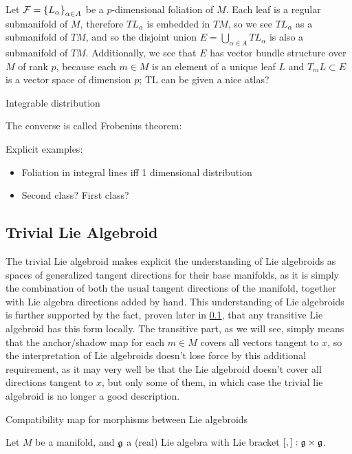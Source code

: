 Let $\mathcal F = \left\{ L_\alpha \right\}_{\alpha \in A}$ be a $p$-dimensional foliation of $M$. Each leaf is a regular submanifold of $M$, therefore $T L_\alpha$ is embedded in $TM$, so we see $T L_\alpha$ as a submanifold  of $TM$, and so the disjoint union $E = \bigcup_{\alpha \in A} T L_\alpha$ is also a submanifold of $TM$. Additionally, we see that $E$ has vector bundle structure over $M$ of rank $p$, because each $m \in M$ is an element of a unique leaf $L$ and $T_m L \subset E$ is a vector space of dimension $p$; TL can be given a nice atlas?

Integrable distribution

The converse is called Frobenius theorem:

Explicit examples:

\begin{itemize}
    \item Foliation in integral lines iff 1 dimensional distribution
    \item Second class? First class?
\end{itemize}

\subsection{Trivial Lie Algebroid}

The trivial Lie algebroid makes explicit the understanding of Lie algebroids as spaces of generalized tangent directions for their base manifolds, as it is simply the combination of both the usual tangent directions of the manifold, together with Lie algebra directions added by hand. This understanding of Lie algebroids is further supported by the fact, proven later in \ref{}, that any transitive Lie algebroid has this form locally. The transitive part, as we will see, simply means that the anchor/shadow map for each $m \in M$ covers all vectors tangent to $x$, so the interpretation of Lie algebroids doesn't lose force by this additional requirement, as it may very well be that the Lie algebroid doesn't cover all directions tangent to $x$, but only some of them, in which case the trivial lie algebroid is no longer a good description.

Compatibility map for morphisms between Lie algebroids

Let $M$ be a manifold, and $\mathfrak{g}$ a (real) Lie algebra with Lie bracket $[,]: \mathfrak{g} \times \mathfrak{g}$. 

